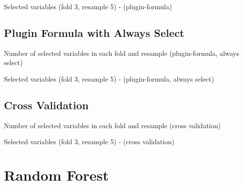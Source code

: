 \documentclass[10pt,leqno]{article}
\begin{document}
\begin{table}[H]
  \centering
  \caption{Selected variables (fold 3, resample 5) - (plugin-formula)}
  \label{tab:1}
  \resizebox{0.5\textwidth}{!}{
    }
\end{table}%

\pagebreak
\subsection{Plugin Formula with Always Select}
\begin{table}[H]
  \centering
  \caption{Number of selected variables in each fold and resample (plugin-formula, always select)}
  \label{tab:1}
  \resizebox{0.35\textwidth}{!}{
    }
\end{table}%

\begin{table}[H]
  \centering
  \caption{Selected variables (fold 3, resample 5) - (plugin-formula, always select)}
  \label{tab:1}
  \resizebox{0.35\textwidth}{!}{
    }
\end{table}%

\pagebreak
\subsection{Cross Validation}

\begin{table}[H]
  \centering
  \caption{Number of selected variables in each fold and resample (cross validation)}
  \label{tab:1}
  \resizebox{0.35\textwidth}{!}{
    }
\end{table}%

\begin{table}[H]
  \centering
  \caption{Selected variables (fold 3, resample 5) - (cross validation)}
  \label{tab:1}
  \resizebox{0.35\textwidth}{!}{
    }
\end{table}%


\pagebreak
\section{Random Forest}
\end{document}
